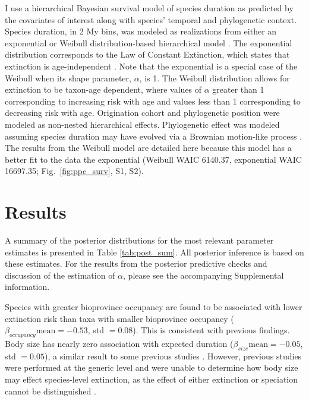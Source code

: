 \documentclass{pnastwo}
\begin{document}
\begin{article}
I use a hierarchical Bayesian survival model of species duration as predicted by the covariates of interest along with species' temporal and phylogenetic context. Species duration, in 2 My bins, was modeled as realizations from either an exponential or Weibull distribution-based hierarchical model \cite{Gelman2013d}. The exponential distribution corresponds to the Law of Constant Extinction, which states that extinction is age-independent \cite{VanValen1973}. Note that the exponential is a special case of the Weibull when its shape parameter, $\alpha$, is 1. The Weibull distribution allows for extinction to be taxon-age dependent, where values of $\alpha$ greater than 1 corresponding to increasing risk with age and values less than 1 corresponding to decreasing risk with age. Origination cohort and phylogenetic position were modeled as non-nested hierarchical effects. Phylogenetic effect was modeled assuming species duration may have evolved via a Brownian motion-like process \cite{Lynch1991,Housworth2004}. The results from the Weibull model are detailed here because this model has a better fit to the data the exponential (Weibull WAIC 6140.37, exponential WAIC 16697.35; Fig.~\ref{fig:ppc_surv}, S1, S2).


\section{Results}
A summary of the posterior distributions for the most relevant parameter estimates is presented in Table \ref{tab:post_sum}. All posterior inference is based on these estimates. For the results from the posterior predictive checks and discussion of the estimation of $\alpha$, please see the accompanying Supplemental information.

Species with greater bioprovince occupancy are found to be associated with lower extinction risk than taxa with smaller bioprovince occupancy (\(\beta_{occupancy} \text{mean} = -0.53\), std \(= 0.08\)). This is consistent with previous findings. Body size has nearly zero association with expected duration (\(\beta_{size} \text{mean} = -0.05\), std \(= 0.05\)), a similar result to some previous studies \cite{Tomiya2013}. However, previous studies were performed at the generic level and were unable to determine how body size may effect species-level extinction, as the effect of either extinction or speciation cannot be distinguished \cite{Liow2008,Tomiya2013}.


\end{article}
\end{document}
